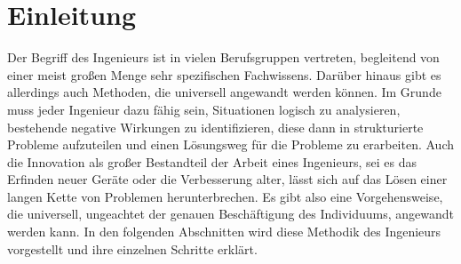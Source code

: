 \section{Einleitung}

Der Begriff des Ingenieurs ist in vielen Berufsgruppen vertreten, begleitend von einer meist großen 
Menge sehr spezifischen Fachwissens. Darüber hinaus gibt es allerdings auch Methoden, die universell 
angewandt werden können. Im Grunde muss jeder Ingenieur dazu fähig sein, Situationen logisch zu 
analysieren, bestehende negative Wirkungen zu identifizieren, diese dann in strukturierte Probleme
 aufzuteilen und einen Lösungsweg für die Probleme zu erarbeiten. Auch die Innovation als großer 
 Bestandteil der Arbeit eines Ingenieurs, sei es das Erfinden neuer Geräte oder die Verbesserung 
 alter, lässt sich auf das Lösen einer langen Kette von Problemen herunterbrechen. Es gibt also 
 eine Vorgehensweise, die universell, ungeachtet der genauen Beschäftigung des Individuums, 
 angewandt werden kann. In den folgenden Abschnitten wird diese Methodik des Ingenieurs vorgestellt 
 und ihre einzelnen Schritte erklärt. 